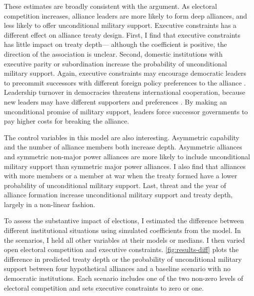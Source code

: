 \documentclass[12pt]{article}
\begin{document}
These estimates are broadly consistent with the argument. 
As electoral competition increases, alliance leaders are more likely to form deep alliances, and less likely to offer unconditional military support. 
Executive constraints has a different effect on alliance treaty design.
First, I find that executive constraints has little impact on treaty depth--- although the coefficient is positive, the direction of the association is unclear.  
Second, domestic institutions with executive parity or subordination increase the probability of unconditional military support.  
Again, executive constraints may encourage democratic leaders to precommit successors with different foreign policy preferences to the alliance \cite{Mattes2012a}. 
Leadership turnover in democracies threatens international cooperation, because new leaders may have different supporters and preferences \citep{Lobell2004, Narizny2007, Leedsetal2009}. 
By making an unconditional promise of military support, leaders force successor governments to pay higher costs for breaking the alliance. 


The control variables in this model are also interesting.
Asymmetric capability and the number of alliance members both increase depth. 
Asymmetric alliances and symmetric non-major power alliances are more likely to include unconditional military support than symmetric major power alliances. 
I also find that alliances with more members or a member at war when the treaty formed have a lower probability of unconditional military support. 
Last, threat and the year of alliance formation increase unconditional military support and treaty depth, largely in a non-linear fashion.


To assess the substantive impact of elections, I estimated the difference between different institutional situations using simulated coefficients from the model. 
In the scenarios, I held all other variables at their models or medians. 
I then varied open electoral competition and executive constraints. 
\autoref{fig:results-diff} plots the difference in predicted treaty depth or the probability of unconditional military support between four hypothetical alliances and a baseline scenario with no democratic institutions. 
Each scenario includes one of the two non-zero levels of electoral competition and sets executive constraints to zero or one. 
\end{document}
